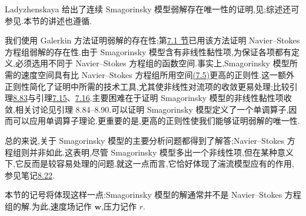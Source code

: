 \begin{note}[解的存在唯一性证明]
\label{note:smagorinsky-existence-proof}
Ladyzhenskaya 给出了连续 Smagorinsky 模型弱解存在唯一性的证明,见\textcite{Ladyzhenskaya1967};综述还可参见\textcite[补编 1]{Ladyzhenskaya1969}.本节的讲述也遵循\textcite[第 6.1 节]{John2004}.

我们使用 Galerkin 方法证明弱解的存在性;第\hyperref[sec:time-dependent-ns-continuous]{7.1 节}已用该方法证明 Navier--Stokes 方程组弱解的存在性.由于 Smagorinsky 模型含有非线性黏性项,为保证各项都有定义,必须选用不同于 Navier--Stokes 方程组的函数空间.事实上,Smagorinsky 模型所需的速度空间具有比 Navier--Stokes 方程组所用空间\hyperref[eq:time-dependent-ns-weak-regularity]{(7.5)}更高的正则性.这一额外正则性简化了证明中所需的技术工具,尤其使非线性对流项的收敛更易处理;比较引理\hyperref[lem:smagorinsky-convection-convergence]{8.83}与引理\hyperref[lem:time-dependent-convection-difference]{7.15}、\hyperref[lem:time-dependent-convection-convergence]{7.16}.主要困难在于证明 Smagorinsky 模型的非线性黏性项收敛,相关讨论见引理 8.84--8.90.可以证明 Smagorinsky 模型定义了一个单调算子,因而可以应用单调算子理论.更重要的是,更高的正则性使我们能够证明弱解的唯一性.

总的来说,关于 Smagorinsky 模型的主要分析问题都得到了解答;Navier--Stokes 方程组则并非如此.这表明,尽管 Smagorinsky 模型多出一个非线性项,但在某种意义下,它反而是较容易处理的问题.就这一点而言,它恰好体现了湍流模型应有的作用,参见笔记\hyperref[note:smaller-complexity-turbulence-models]{8.22}.
\end{note}

\begin{note}[记号]
\label{note:smagorinsky-notation}
本节的记号将体现这样一点:Smagorinsky 模型的解通常并不是 Navier--Stokes 方程组的解.为此,速度场记作 $\bm{w}$,压力记作 $r$.
\end{note}

